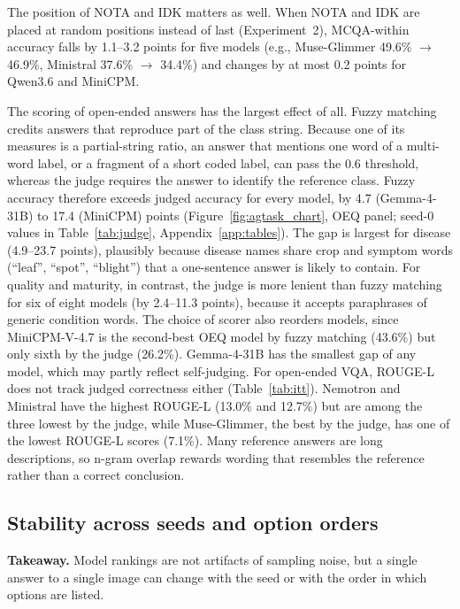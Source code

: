 \documentclass[10pt,letterpaper]{article}
\makeatletter
\newcommand{\takeaway}[1]{\par\smallskip\noindent\colorbox{black!6}{\parbox{\dimexpr\linewidth-2\fboxsep\relax}{\textbf{Takeaway.} #1}}\par\medskip\@afterindentfalse\@afterheading}
\makeatother
\begin{document}
The position of NOTA and IDK matters as well. When NOTA and IDK are placed at random positions instead of last (Experiment~2), MCQA-within accuracy falls by 1.1--3.2 points for five models (e.g., Muse-Glimmer 49.6\% $\rightarrow$ 46.9\%, Ministral 37.6\% $\rightarrow$ 34.4\%) and changes by at most 0.2 points for Qwen3.6 and MiniCPM.

The scoring of open-ended answers has the largest effect of all. Fuzzy matching credits answers that reproduce part of the class string. Because one of its measures is a partial-string ratio, an answer that mentions one word of a multi-word label, or a fragment of a short coded label, can pass the 0.6 threshold, whereas the judge requires the answer to identify the reference class. Fuzzy accuracy therefore exceeds judged accuracy for every model, by 4.7 (Gemma-4-31B) to 17.4 (MiniCPM) points (Figure~\ref{fig:agtask_chart}, OEQ panel; seed-0 values in Table~\ref{tab:judge}, Appendix~\ref{app:tables}). The gap is largest for disease (4.9--23.7 points), plausibly because disease names share crop and symptom words (``leaf'', ``spot'', ``blight'') that a one-sentence answer is likely to contain. For quality and maturity, in contrast, the judge is more lenient than fuzzy matching for six of eight models (by 2.4--11.3 points), because it accepts paraphrases of generic condition words. The choice of scorer also reorders models, since MiniCPM-V-4.7 is the second-best OEQ model by fuzzy matching (43.6\%) but only sixth by the judge (26.2\%).
Gemma-4-31B has the smallest gap of any model, which may partly reflect self-judging. For open-ended VQA, ROUGE-L does not track judged correctness either (Table~\ref{tab:itt}). Nemotron and Ministral have the highest ROUGE-L (13.0\% and 12.7\%) but are among the three lowest by the judge, while Muse-Glimmer, the best by the judge, has one of the lowest ROUGE-L scores (7.1\%). Many reference answers are long descriptions, so n-gram overlap rewards wording that resembles the reference rather than a correct conclusion.

\subsection{Stability across seeds and option orders}
\label{sec:results_stability}
\label{sec:results_seeds}

\takeaway{Model rankings are not artifacts of sampling noise, but a single answer to a single image can change with the seed or with the order in which options are listed.}
\end{document}

